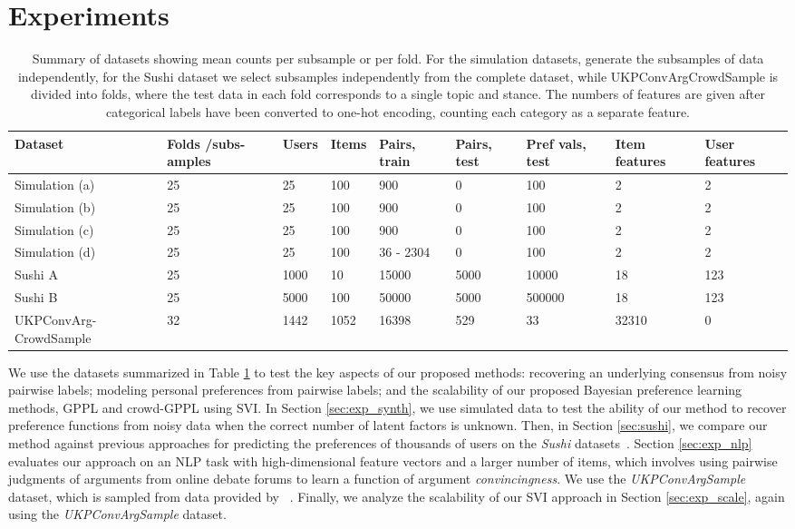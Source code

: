 \section{Experiments}\label{sec:expts}

\begin{table}
\begin{tabularx}{\textwidth}{| p{1.9cm} | X | X | X | X | X | X | X | X |}
\hline
Dataset & Folds /subs-amples & Users & Items & Pairs, train & Pairs, test & Pref vals, test & Item features & User features \\
\hline\hline
Simulation (a) & 25 & 25 & 100 & 900 & 0  & 100 & 2 & 2\\
Simulation (b) & 25 & 25 & 100 & 900 & 0 & 100 & 2 & 2 \\
Simulation (c) & 25 & 25 & 100 & 900 & 0 & 100 & 2 & 2\\
Simulation (d) & 25 & 25 & 100 & 36 - 2304 & 0 & 100 & 2 & 2\\
\hline
Sushi A & 25 & 1000 & 10 & 15000 & 5000 & 10000 & 18 & 123 \\
Sushi B & 25 & 5000 & 100 & 50000 & 5000 & 500000 &  18 & 123 \\
\hline
UKPConvArg-CrowdSample & 32 & 1442 & 1052 & 16398 & 529 & 33 & 32310 & 0
\\ \hline
\end{tabularx}
\caption{Summary of datasets showing mean counts per subsample or per fold. For the simulation datasets, generate the subsamples of data independently, for the Sushi dataset we select subsamples independently from the complete dataset, while  
UKPConvArgCrowdSample is divided into folds, where the test data in each fold corresponds to a single topic and stance. The numbers of features are given after categorical labels have been converted to one-hot encoding, counting
each category as a separate feature.
}
\label{tab:datasets}
\end{table}
We use the datasets summarized in Table \ref{tab:datasets} to test the key aspects of our proposed methods: recovering an underlying consensus from noisy pairwise labels; modeling personal preferences from pairwise labels; and the scalability of our proposed Bayesian preference learning methods, GPPL and crowd-GPPL using SVI.
In Section \ref{sec:exp_synth}, we use simulated data to test the ability of our method to recover preference functions from noisy data when the correct number of latent factors is unknown. 
Then, in Section \ref{sec:sushi}, we compare our method against previous approaches for predicting the preferences
of thousands of users on the \emph{Sushi} datasets~\citep{kamishima2003nantonac}.
Section \ref{sec:exp_nlp} evaluates our approach on an NLP task with high-dimensional feature vectors and
a larger number of items, which involves using pairwise judgments of arguments from online debate forums 
to learn a function of argument \emph{convincingness}. We use the \emph{UKPConvArgSample} dataset, which is 
sampled from data provided by ~\citet{habernal2016argument}. 
Finally, we analyze the scalability of our SVI approach in Section \ref{sec:exp_scale}, again using the \emph{UKPConvArgSample} dataset.

